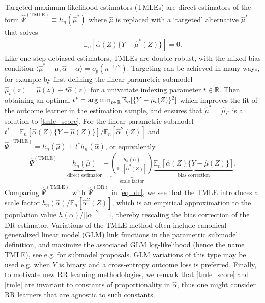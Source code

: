 Targeted maximum likelihood estimators (TMLEs) 
are direct estimators of the form $\hat{\Psi}^{(\text{TMLE})} \equiv h_n(\hat{\mu}^*)$ where $\hat{\mu}$ is replaced with a `targeted' alternative $\hat{\mu}^*$ that solves %
\begin{align}
    \mathbb{E}_n[\hat{\alpha}(Z)\{Y - \hat{\mu}^*(Z)\}] = 0. \label{tmle_score}
\end{align}
Like one-step debiased estimators, TMLEs are double robust, with the mixed bias condition $\langle \hat{\mu}^* - \mu, \hat{\alpha} - \alpha  \rangle = o_p(n^{-1/2})$. Targeting can be achieved in many ways, for example by first defining the linear parametric submodel $\hat{\mu}_t(z) = \hat{\mu}(z) + t \hat{\alpha}(z)$ for a univariate indexing parameter $t\in \mathbb{R}$. Then obtaining an optimal $t^* = \operatorname*{arg\,min}_{t \in \mathbb{R}} \mathbb{E}_n[\{Y-\hat{\mu}_t(Z)\}^2]$ which improves the fit of the outcome learner in the estimation sample, and ensures that $\hat{\mu}^* = \hat{\mu}_{t^*}$ is a solution to \eqref{tmle_score}. For the linear parametric submodel $t^* = \mathbb{E}_n[\hat{\alpha}(Z)\{Y - \hat{\mu}(Z)\}] / \mathbb{E}_n [ \hat{\alpha}^2(Z)]$ and $\hat{\Psi}^{(\text{TMLE})} = h_n(\hat{\mu}) + t^* h_n(\hat{\alpha})$, or equivalently
\begin{align}
    \hat{\Psi}^{(\text{TMLE})} = \underbrace{h_n(\hat{\mu})}_{\text{direct estimator}} + \underbrace{ \left(\frac{h_n(\hat{\alpha})}{\mathbb{E}_n [ \hat{\alpha}^2(Z)]}\right)}_{\text{scale factor}}  \underbrace{\mathbb{E}_n[\hat{\alpha}(Z)\{Y - \hat{\mu}(Z)\}]}_{\text{bias correction}} . \label{tmle}
\end{align}
Comparing $\hat{\Psi}^{(\text{TMLE})}$ with $\hat{\Psi}^{(\text{DR})}$ in \eqref{eq_dr}, we see that the TMLE introduces a scale factor $h_n(\hat{\alpha}) / \mathbb{E}_n [ \hat{\alpha}^2(Z)]$, which is an empirical approximation to the population value $h(\alpha) / ||\alpha||^2 = 1$, thereby rescaling the bias correction of the DR estimator. Variations of the TMLE method often include canonical generalized linear model (GLM) link functions in the parametric submodel definition, and maximize the associated GLM log-likelihood (hence the name TMLE), see e.g. \citep{VanDerLaan2016} for submodel proposals. GLM variations of this type may be used e.g. when $Y$ is binary and a cross-entropy outcome loss is preferred. Finally, to motivate new RR learning methodologies, we remark that \eqref{tmle_score} and \eqref{tmle} are invariant to constants of proportionality in $\hat{\alpha}$, thus one might consider RR learners that are agnostic to such constants.

